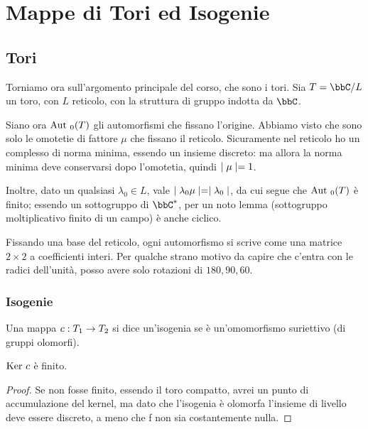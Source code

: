 \chapter{Mappe di Tori ed Isogenie}


	\section{Tori}

	Torniamo ora sull'argomento principale del corso, che sono i tori. Sia $T = \bbC / L$ un toro, con $L$ reticolo, con la struttura di gruppo indotta da $\bbC$.

	Siano ora $\text{Aut }_0(T)$ gli automorfismi che fissano l'origine. Abbiamo visto che sono solo le omotetie di fattore $\mu$ che fissano il reticolo. Sicuramente nel reticolo ho un complesso di norma minima, essendo un insieme discreto: ma allora la norma minima deve conservarsi dopo l'omotetia, quindi $\mid \mu \mid=1$.

	Inoltre, dato un qualsiasi $\lambda_0 \in L$, vale $\mid \lambda_0 \mu \mid = \mid \lambda_0 \mid$, da cui segue che $\text{Aut }_0(T)$ è finito; essendo un sottogruppo di $\bbC^*$, per un noto lemma (sottogruppo moltiplicativo finito di un campo) è anche ciclico.

	Fissando una base del reticolo, ogni automorfismo si scrive come una matrice $2 \times 2$ a coefficienti interi. Per qualche strano motivo da capire che c'entra con le radici dell'unità, %
	posso avere solo rotazioni di $180, 90, 60$.

	\subsection{Isogenie}
	\begin{definizione}
		Una mappa $c: T_1 \rightarrow T_2$ si dice un'isogenia se è un'omomorfismo suriettivo (di gruppi olomorfi).
	\end{definizione}

	\begin{proposizione}
		$\mbox{Ker } c$ è finito.
	\end{proposizione}
	\begin{proof}
		Se non fosse finito, essendo il toro compatto, avrei un punto di accumulazione del kernel, ma dato che l'isogenia è olomorfa l'insieme di livello deve essere discreto, a meno che f non sia costantemente nulla.
	\end{proof}


